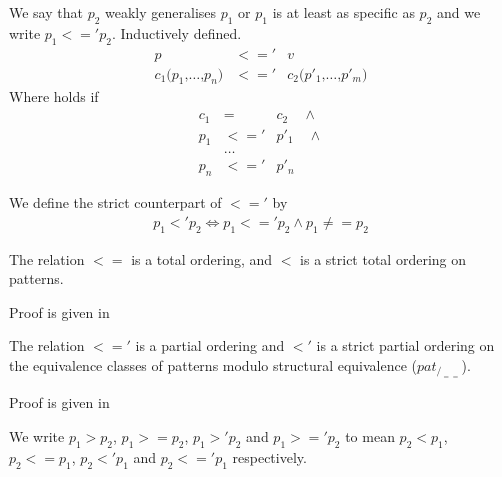 \begin{definition}[Partial ordering, $<='$]\label{def:pat-partial-order-weak}
  We say that $p_2$ weakly generalises $p_1$ or $p_1$ is at least as specific as
  $p_2$ and we write $p_1 <=' p_2$. Inductively defined.
  \begin{eqnarray}
    p &<='& v \label{eq:pat-partial-order-weak-var}\\
    c_1\texttt{(}p_1\texttt{,} \ldots\texttt{,} p_n\texttt{)} &<='&
    c_2\texttt{(}p'_1\texttt{,} \ldots\texttt{,} p'_m\texttt{)}\label{eq:pat-partial-order-weak-con}
  \end{eqnarray}
  Where  holds if
  \begin{eqnarray*}
    c_1 &=& c_2 \quad \land\\
    p_1 &<='& p'_1 \quad \land\\
    &\ldots&\\
    p_n &<='& p'_n
  \end{eqnarray*}
\end{definition}


\begin{definition}\label{def:pat-partial-order-strict}
  We define the strict counterpart of $<='$ by
  \begin{eqnarray*}
      p_1 <' p_2 \Longleftrightarrow p_1 <=' p_2 \land p_1 \not == p_2
  \end{eqnarray*}
\end{definition}

\begin{lemma}\label{lem:pat-total-orderings}
  The relation $<=$ is a total ordering, and $<$ is a strict total ordering on
  patterns.
  
  Proof is given in 
\end{lemma}


\begin{lemma}\label{lem:pat-partial-orderings}
  The relation $<='$ is a partial ordering and $<'$ is a strict partial ordering
  on the equivalence classes of patterns modulo structural equivalence
  ($pat_{/_{==}}$).

  Proof is given in 
\end{lemma}

We write $p_1 > p_2$, $p_1 >= p_2$, $p_1 >' p_2$ and $p_1 >=' p_2$ to mean $p_2
< p_1$, $p_2 <= p_1$, $p_2 <' p_1$ and $p_2 <=' p_1$ respectively.

